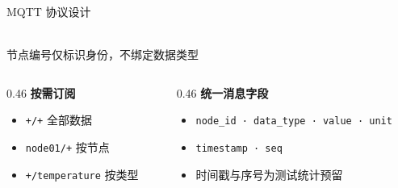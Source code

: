\documentclass[aspectratio=169,10pt]{ctexbeamer}
\begin{document}
\begin{frame}{MQTT 协议设计}
  \vspace{4pt}
  \begin{center}
    \\[5pt]
    {\small\color{black!60} 节点编号仅标识身份，不绑定数据类型}
  \end{center}
  \vspace{8pt}
  \begin{columns}[T]
    \begin{column}{0.46\textwidth}
      \textbf{按需订阅}
      {\footnotesize
      \begin{itemize}
        \item \texttt{+/+} \hfill 全部数据
        \item \texttt{node01/+} \hfill 按节点
        \item \texttt{+/temperature} \hfill 按类型
      \end{itemize}}
    \end{column}
    \begin{column}{0.46\textwidth}
      \textbf{统一消息字段}
      {\footnotesize
      \begin{itemize}
        \item \texttt{node\_id · data\_type · value · unit}
        \item \texttt{timestamp · seq}
        \item 时间戳与序号为测试统计预留
      \end{itemize}}
    \end{column}
  \end{columns}
\end{frame}
\end{document}
